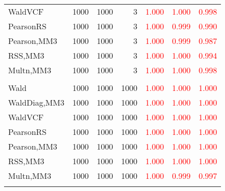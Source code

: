 \documentclass[
]{article}
\begin{document}
\begin{table}[H]
{\begin{tabular}[t]{lrrrrrr}
\hspace{1em}WaldVCF & 1000 & 1000 & 3 & \textcolor{red}{1.000} & \textcolor{red}{1.000} & \textcolor{red}{0.998}\\
\hspace{1em}PearsonRS & 1000 & 1000 & 3 & \textcolor{red}{1.000} & \textcolor{red}{0.999} & \textcolor{red}{0.990}\\
\hspace{1em}Pearson,MM3 & 1000 & 1000 & 3 & \textcolor{red}{1.000} & \textcolor{red}{0.999} & \textcolor{red}{0.987}\\
\hspace{1em}RSS,MM3 & 1000 & 1000 & 3 & \textcolor{red}{1.000} & \textcolor{red}{1.000} & \textcolor{red}{0.994}\\
\hspace{1em}Multn,MM3 & 1000 & 1000 & 3 & \textcolor{red}{1.000} & \textcolor{red}{1.000} & \textcolor{red}{0.998}\\
\addlinespace[0.3em]
\multicolumn{7}{l}{\textbf{1F 15V}}\\
\hspace{1em}Wald & 1000 & 1000 & 1000 & \textcolor{red}{1.000} & \textcolor{red}{1.000} & \vphantom{1} \textcolor{red}{1.000}\\
\hspace{1em}WaldDiag,MM3 & 1000 & 1000 & 1000 & \textcolor{red}{1.000} & \textcolor{red}{1.000} & \textcolor{red}{1.000}\\
\hspace{1em}WaldVCF & 1000 & 1000 & 1000 & \textcolor{red}{1.000} & \textcolor{red}{1.000} & \vphantom{1} \textcolor{red}{1.000}\\
\hspace{1em}PearsonRS & 1000 & 1000 & 1000 & \textcolor{red}{1.000} & \textcolor{red}{1.000} & \textcolor{red}{1.000}\\
\hspace{1em}Pearson,MM3 & 1000 & 1000 & 1000 & \textcolor{red}{1.000} & \textcolor{red}{1.000} & \textcolor{red}{1.000}\\
\hspace{1em}RSS,MM3 & 1000 & 1000 & 1000 & \textcolor{red}{1.000} & \textcolor{red}{1.000} & \textcolor{red}{1.000}\\
\hspace{1em}Multn,MM3 & 1000 & 1000 & 1000 & \textcolor{red}{1.000} & \textcolor{red}{0.999} & \textcolor{red}{0.997}\\
\addlinespace[0.3em]
\multicolumn{7}{l}{\textbf{2F 10V}}\\

\end{tabular}}
\end{table}
\end{document}
